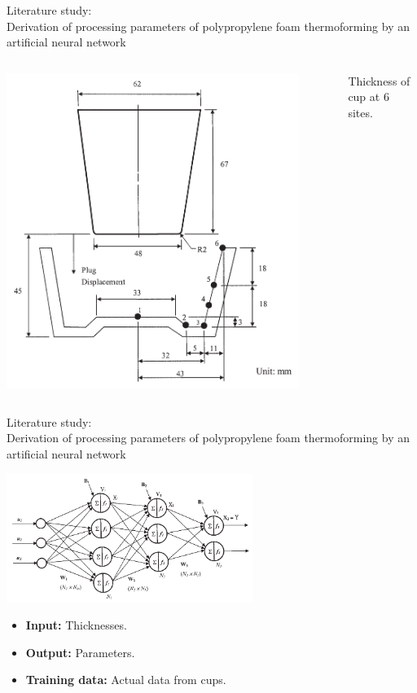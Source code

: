 \documentclass{beamer}
\begin{document}
	\begin{frame}{Literature study:\\Derivation of processing parameters of polypropylene foam thermoforming by an artificial neural network}
		\begin{columns}
			\begin{column}{0.5\textwidth}
				\begin{center}
					\includegraphics[width=0.9\textwidth]{Figures/CupDimensions.pdf}
				\end{center}
			\end{column}
			\begin{column}{0.5\textwidth}  %
				Thickness of cup at 6 sites.
			\end{column}
		\end{columns}
	\end{frame}

	\begin{frame}{Literature study:\\Derivation of processing parameters of polypropylene foam thermoforming by an artificial neural network}
		\begin{center}
			\includegraphics[width=0.6\textwidth]{Figures/NeuralNet.pdf}
		\end{center}
		\begin{itemize}
			\item \textbf{Input:} Thicknesses.
			\item \textbf{Output:} Parameters.
			\item \textbf{Training data:} Actual data from cups.
		\end{itemize}
	\end{frame}
\end{document}
